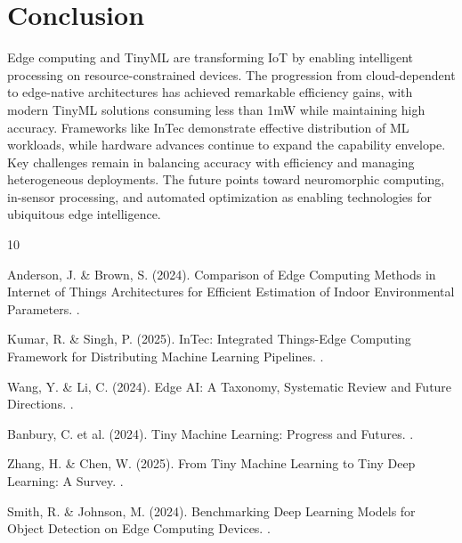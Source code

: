 \documentclass[12pt,a4paper]{article}
\begin{document}
\section{Conclusion}

Edge computing and TinyML are transforming IoT by enabling intelligent processing on resource-constrained devices. The progression from cloud-dependent to edge-native architectures has achieved remarkable efficiency gains, with modern TinyML solutions consuming less than 1mW while maintaining high accuracy. Frameworks like InTec demonstrate effective distribution of ML workloads, while hardware advances continue to expand the capability envelope. Key challenges remain in balancing accuracy with efficiency and managing heterogeneous deployments. The future points toward neuromorphic computing, in-sensor processing, and automated optimization as enabling technologies for ubiquitous edge intelligence.


\begin{thebibliography}{10}

Anderson, J. \& Brown, S. (2024).
\newblock Comparison of Edge Computing Methods in Internet of Things Architectures for Efficient Estimation of Indoor Environmental Parameters.
.

Kumar, R. \& Singh, P. (2025).
\newblock InTec: Integrated Things-Edge Computing Framework for Distributing Machine Learning Pipelines.
.

Wang, Y. \& Li, C. (2024).
\newblock Edge AI: A Taxonomy, Systematic Review and Future Directions.
.

Banbury, C. et al. (2024).
\newblock Tiny Machine Learning: Progress and Futures.
.

Zhang, H. \& Chen, W. (2025).
\newblock From Tiny Machine Learning to Tiny Deep Learning: A Survey.
.

Smith, R. \& Johnson, M. (2024).
\newblock Benchmarking Deep Learning Models for Object Detection on Edge Computing Devices.
.

\end{thebibliography}
\end{document}
